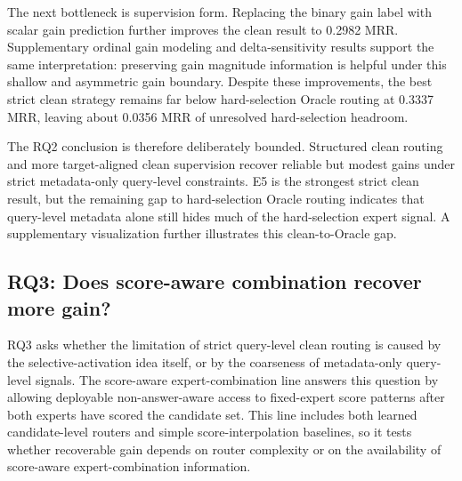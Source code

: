 \documentclass[11pt]{article}
\begin{document}
The next bottleneck is supervision form. Replacing the binary gain label with scalar gain prediction further improves the clean result to 0.2982 MRR. Supplementary ordinal gain modeling and delta-sensitivity results support the same interpretation: preserving gain magnitude information is helpful under this shallow and asymmetric gain boundary. Despite these improvements, the best strict clean strategy remains far below hard-selection Oracle routing at 0.3337 MRR, leaving about 0.0356 MRR of unresolved hard-selection headroom.

The RQ2 conclusion is therefore deliberately bounded. Structured clean routing and more target-aligned clean supervision recover reliable but modest gains under strict metadata-only query-level constraints. E5 is the strongest strict clean result, but the remaining gap to hard-selection Oracle routing indicates that query-level metadata alone still hides much of the hard-selection expert signal. A supplementary visualization further illustrates this clean-to-Oracle gap.

\subsection{RQ3: Does score-aware combination recover more gain?}
RQ3 asks whether the limitation of strict query-level clean routing is caused by the selective-activation idea itself, or by the coarseness of metadata-only query-level signals. The score-aware expert-combination line answers this question by allowing deployable non-answer-aware access to fixed-expert score patterns after both experts have scored the candidate set. This line includes both learned candidate-level routers and simple score-interpolation baselines, so it tests whether recoverable gain depends on router complexity or on the availability of score-aware expert-combination information.
\end{document}
